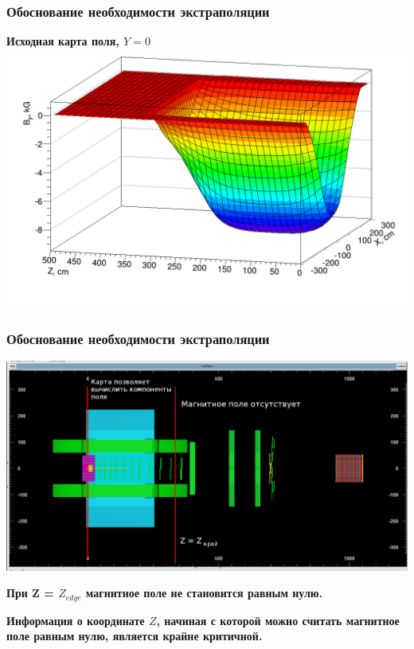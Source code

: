 \documentclass[svgnames] {beamer}
\begin{document}
\begin{frame}
  \frametitle{\centering Обоснование необходимости экстраполяции}
  \begin{block}{\centering \bf Исходная карта поля, $Y = 0$}
    \centering \includegraphics[width=1.0\linewidth]{fieldMap_orig_pic2.png}
  \end{block}
\end{frame}

\begin{frame}
  \frametitle{Обоснование необходимости экстраполяции}
  \begin{block}{}
    \centering \includegraphics[width=0.8\linewidth]{extrap_explan.png}
  \end{block}
  \begin{block}{}
    \begin{itemize}
    {\footnotesize \item  \bf При Z = $Z_{edge}$ магнитное поле не становится равным нулю.}
    {\footnotesize \item  \bf Информация о координате $Z$, начиная с которой можно считать магнитное поле равным нулю, является крайне критичной.}
    \end{itemize}
  \end{block}
\end{frame}
\end{document}
